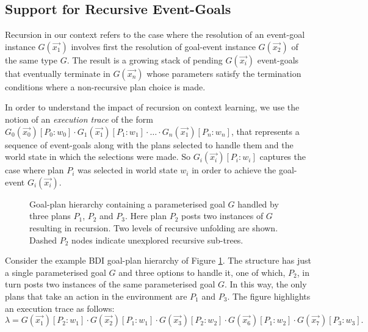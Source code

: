 \subsection{Support for Recursive Event-Goals}

Recursion in our context refers to the case where the resolution of an event-goal instance $G(\vec{x_1})$ involves first the resolution of goal-event instance $G(\vec{x_2})$ of the same type $G$. The result is a growing stack of pending $G(\vec{x_i})$ event-goals that eventually terminate in $G(\vec{x_n})$ whose parameters satisfy the termination conditions where a non-recursive plan choice is made.

In order to understand the impact of recursion on context learning, we use the notion of an \textit{execution trace} of the form $G_0(\vec{x_0})[P_0:w_0] \cdot G_1(\vec{x_1})[P_1:w_1] \cdot \ldots \cdot G_n(\vec{x_1})[P_n:w_n]$, that represents a sequence of event-goals along with the plans selected to handle them and the world state in which the selections were made. So $G_i(\vec{x_i})[P_i:w_i]$ captures the case where plan $P_i$ was selected in world state $w_i$ in order to achieve the goal-event $G_i(\vec{x_i})$.

\begin{figure}[t]
\begin{center}
\resizebox{0.6\textwidth}{!}{

}
\end{center}
\vskip -0.5cm
\caption{Goal-plan hierarchy containing a parameterised goal $G$ handled by three plans $P_1$, $P_2$ and $P_3$. Here plan $P_2$ posts two instances of $G$ resulting in recursion. Two levels of recursive unfolding are shown. Dashed $P_2$ nodes indicate unexplored recursive sub-trees.}
\label{fig:unfolding}
\end{figure}

Consider the example BDI goal-plan hierarchy of Figure \ref{fig:unfolding}. The structure has just a single parameterised goal $G$ and three options to handle it, one of which, $P_2$, in turn posts two instances of the same parameterised goal $G$. In this way, the only plans that take an action in the environment are $P_1$ and $P_3$. The figure highlights an execution trace as follows: \[
\lambda=G(\vec{x_1})[P_2:w_1] \cdot G(\vec{x_2})[P_1:w_1] \cdot G(\vec{x_3})[P_2:w_2] \cdot G(\vec{x_6})[P_1:w_2] \cdot G(\vec{x_7})[P_3:w_3].
\]


